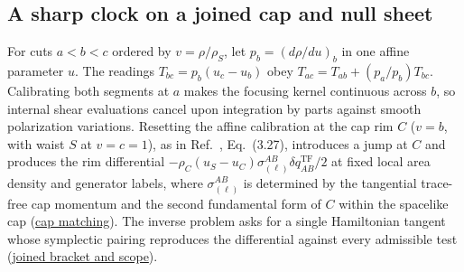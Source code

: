 \documentclass[10pt,a4paper]{article}
\numberwithin{equation}{section}
\newcommand{\repo}[2]{\href{https://github.com/sprajs/quantum-gravity/blob/main/#1}{#2}}
\begin{document}
\subsection{A sharp clock on a joined cap and null sheet}
\label{sec:joint}
For cuts $a<b<c$ ordered by $v=\rho/\rho_S$, let $p_b=(d\rho/du)_b$ in one affine parameter $u$. The readings $T_{bc}=p_b(u_c-u_b)$ obey $T_{ac}=T_{ab}+(p_a/p_b)T_{bc}$.
Calibrating both segments at $a$ makes the focusing kernel continuous across $b$, so internal shear evaluations cancel upon integration by parts against smooth polarization variations.
Resetting the affine calibration at the cap rim $C$ ($v=b$, with waist $S$ at $v=c=1$), as in Ref.~\cite{Chandrasekaran2026}, Eq.~(3.27), introduces a jump at $C$ and produces the rim differential $-\rho_C(u_S-u_C)\sigma^{AB}_{(\ell)}\delta q^{\mathrm{TF}}_{AB}/2$ at fixed local area density and generator labels, where $\sigma^{AB}_{(\ell)}$ is determined by the tangential trace-free cap momentum and the second fundamental form of $C$ within the spacelike cap (\repo{audit/joint-edges.md}{cap matching}).
The inverse problem asks for a single Hamiltonian tangent whose symplectic pairing reproduces the differential against every admissible test (\repo{audit/joint-clock.md}{joined bracket and scope}).
\end{document}
